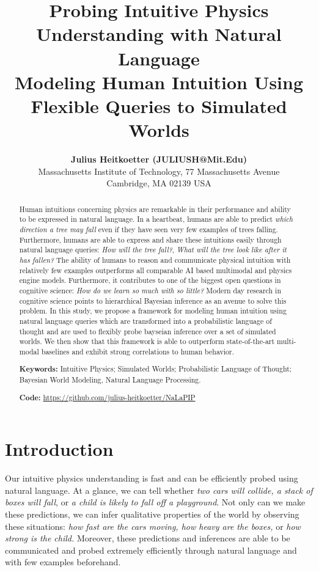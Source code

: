 \documentclass[10pt,letterpaper]{article}
\title{%
  Probing Intuitive Physics Understanding with Natural Language \\
  \large Modeling Human Intuition Using Flexible Queries to Simulated Worlds }
\author{{\large \bf Julius Heitkoetter (JULIUSH@Mit.Edu)} \\
  Massachusetts Institute of Technology, 77 Massachusetts Avenue \\
  Cambridge, MA 02139 USA}
\begin{document}
\maketitle


\begin{abstract}
Human intuitions concerning physics are remarkable in their performance and ability to be expressed in natural language. In a heartbeat, humans are able to predict \textit{which direction a tree may fall} even if they have seen very few examples of trees falling. Furthermore, humans are able to express and share these intuitions easily through natural language queries: \textit{How will the tree fall?}, \textit{What will the tree look like after it has fallen?} The ability of humans to reason and communicate physical intuition with relatively few examples outperforms all comparable AI based multimodal and physics engine models. Furthermore, it contributes to one of the biggest open questions in cognitive science: \textit{How do we learn so much with so little?} Modern day research in cognitive science points to hierarchical Bayesian inference as an avenue to solve this problem. In this study, we propose a framework for modeling human intuition using natural language queries which are transformed into a probabilistic language of thought and are used to flexibly probe bayseian inference over a set of simulated worlds. We then show that this framework is able to outperform state-of-the-art multi-modal baselines and exhibit strong correlations to human behavior. 

\textbf{Keywords:} 
Intuitive Physics; Simulated Worlds; Probabilistic Language of Thought; Bayesian World Modeling, Natural Language Processing.

\textbf{Code:} \url{https://github.com/julius-heitkoetter/NaLaPIP}
\end{abstract}


\section{Introduction}

Our intuitive physics understanding is fast and can be efficiently probed using natural language. At a glance, we can tell whether \textit{two cars will collide, a stack of boxes will fall}, or \textit{a child is likely to fall off a playground}. Not only can we make these predictions, we can infer qualitative properties of the world by observing these situations: \textit{how fast are the cars moving, how heavy are the boxes,} or \textit{how strong is the child.} Moreover, these predictions and inferences are able to be communicated and probed extremely efficiently through natural language and with few examples beforehand.
\end{document}
